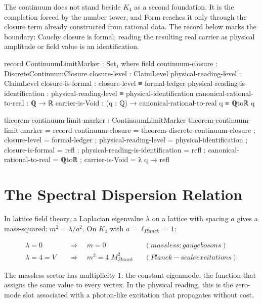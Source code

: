 \documentclass[11pt,a4paper]{book}
\def\text#1{#1}%
\begin{document}
The continuum does not stand beside $K_4$ as a second foundation. It is the completion forced by the number tower, and Form reaches it only through the closure term already constructed from rational data. The record below marks the boundary: Cauchy closure is formal; reading the resulting real carrier as physical amplitude or field value is an identification.

\begin{code}
record ContinuumLimitMarker : Set₁ where
  field
    continuum-closure                 : DiscreteContinuumClosure
    closure-level                     : ClaimLevel
    physical-reading-level            : ClaimLevel
    closure-is-formal                 : closure-level ≡ formal-ledger
    physical-reading-is-identification : physical-reading-level ≡ physical-identification
    canonical-rational-to-real        : ℚ → ℝ
    carrier-is-Void                   : (q : ℚ) → canonical-rational-to-real q ≡ ℚtoℝ q

theorem-continuum-limit-marker : ContinuumLimitMarker
theorem-continuum-limit-marker = record
  { continuum-closure                  = theorem-discrete-continuum-closure
  ; closure-level                      = formal-ledger
  ; physical-reading-level             = physical-identification
  ; closure-is-formal                  = refl
  ; physical-reading-is-identification = refl
  ; canonical-rational-to-real         = ℚtoℝ
  ; carrier-is-Void                    = λ q → refl }
\end{code}

\section{The Spectral Dispersion Relation}
\label{sec:spectral-dispersion}

In lattice field theory, a Laplacian eigenvalue $\lambda$ on a lattice with spacing $a$ gives a mass-squared: $m^2 = \lambda / a^2$. On $K_4$ with $a = \ell_{\text{Planck}} = 1$:

\begin{align}
  \lambda = 0 \quad &\Longrightarrow \quad m = 0 && \text{(massless: gauge bosons)} \\
  \lambda = 4 = V \quad &\Longrightarrow \quad m^2 = 4 \; M_{\text{Planck}}^2 && \text{(Planck-scale excitations)}
\end{align}

The massless sector has multiplicity $1$: the constant eigenmode, the function that assigns the same value to every vertex. In the physical reading, this is the zero-mode slot associated with a photon-like excitation that propagates without cost.
\end{document}
